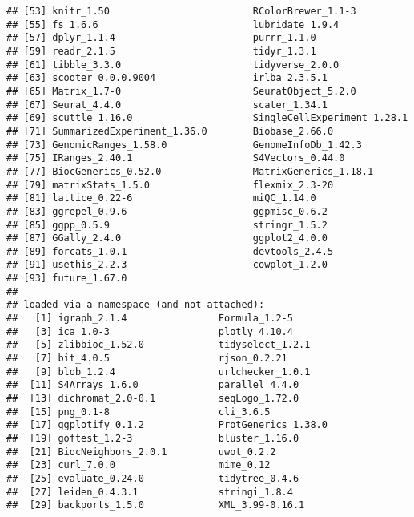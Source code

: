\documentclass[
  11pt,
  a4paper,
]{article}
\begin{document}
\begin{verbatim}
## [53] knitr_1.50                         RColorBrewer_1.1-3                
## [55] fs_1.6.6                           lubridate_1.9.4                   
## [57] dplyr_1.1.4                        purrr_1.1.0                       
## [59] readr_2.1.5                        tidyr_1.3.1                       
## [61] tibble_3.3.0                       tidyverse_2.0.0                   
## [63] scooter_0.0.0.9004                 irlba_2.3.5.1                     
## [65] Matrix_1.7-0                       SeuratObject_5.2.0                
## [67] Seurat_4.4.0                       scater_1.34.1                     
## [69] scuttle_1.16.0                     SingleCellExperiment_1.28.1       
## [71] SummarizedExperiment_1.36.0        Biobase_2.66.0                    
## [73] GenomicRanges_1.58.0               GenomeInfoDb_1.42.3               
## [75] IRanges_2.40.1                     S4Vectors_0.44.0                  
## [77] BiocGenerics_0.52.0                MatrixGenerics_1.18.1             
## [79] matrixStats_1.5.0                  flexmix_2.3-20                    
## [81] lattice_0.22-6                     miQC_1.14.0                       
## [83] ggrepel_0.9.6                      ggpmisc_0.6.2                     
## [85] ggpp_0.5.9                         stringr_1.5.2                     
## [87] GGally_2.4.0                       ggplot2_4.0.0                     
## [89] forcats_1.0.1                      devtools_2.4.5                    
## [91] usethis_2.2.3                      cowplot_1.2.0                     
## [93] future_1.67.0                     
## 
## loaded via a namespace (and not attached):
##   [1] igraph_2.1.4                Formula_1.2-5              
##   [3] ica_1.0-3                   plotly_4.10.4              
##   [5] zlibbioc_1.52.0             tidyselect_1.2.1           
##   [7] bit_4.0.5                   rjson_0.2.21               
##   [9] blob_1.2.4                  urlchecker_1.0.1           
##  [11] S4Arrays_1.6.0              parallel_4.4.0             
##  [13] dichromat_2.0-0.1           seqLogo_1.72.0             
##  [15] png_0.1-8                   cli_3.6.5                  
##  [17] ggplotify_0.1.2             ProtGenerics_1.38.0        
##  [19] goftest_1.2-3               bluster_1.16.0             
##  [21] BiocNeighbors_2.0.1         uwot_0.2.2                 
##  [23] curl_7.0.0                  mime_0.12                  
##  [25] evaluate_0.24.0             tidytree_0.4.6             
##  [27] leiden_0.4.3.1              stringi_1.8.4              
##  [29] backports_1.5.0             XML_3.99-0.16.1            

\end{verbatim}
\end{document}
